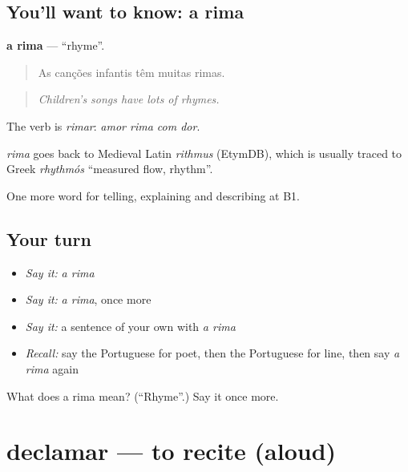 \subsection*{You'll want to know: a rima}
\textbf{a rima} — \textquotedblleft{}rhyme\textquotedblright{}.

\begin{quote}
As canções infantis têm muitas rimas.
\end{quote}

\begin{quote}
\emph{Children's songs have lots of rhymes.}
\end{quote}

The verb is \emph{rimar}: \emph{amor rima com dor}.

\begin{cousinweb}
\emph{rima} goes back to Medieval Latin \emph{rithmus} (EtymDB), which is usually traced to Greek \emph{rhythmós} \textquotedblleft{}measured flow, rhythm\textquotedblright{}.
\end{cousinweb}

\begin{grammarlens}[title={What you've built}]
One more word for telling, explaining and describing at B1.
\end{grammarlens}

\subsection*{Your turn}
\begin{itemize}
\raggedright
  \item \emph{Say it:} \emph{a rima}
  \item \emph{Say it:} \emph{a rima}, once more
  \item \emph{Say it:} a sentence of your own with \emph{a rima}
  \item \emph{Recall:} say the Portuguese for poet, then the Portuguese for line, then say \emph{a rima} again
\end{itemize}

\begin{tcolorbox}[breakable,colback=teal!4,colframe=teal!35!black,title={Before you move on}]
What does a rima mean? (\textquotedblleft{}Rhyme\textquotedblright{}.) Say it once more.
\end{tcolorbox}
\section[declamar]{declamar — to recite (aloud)}

